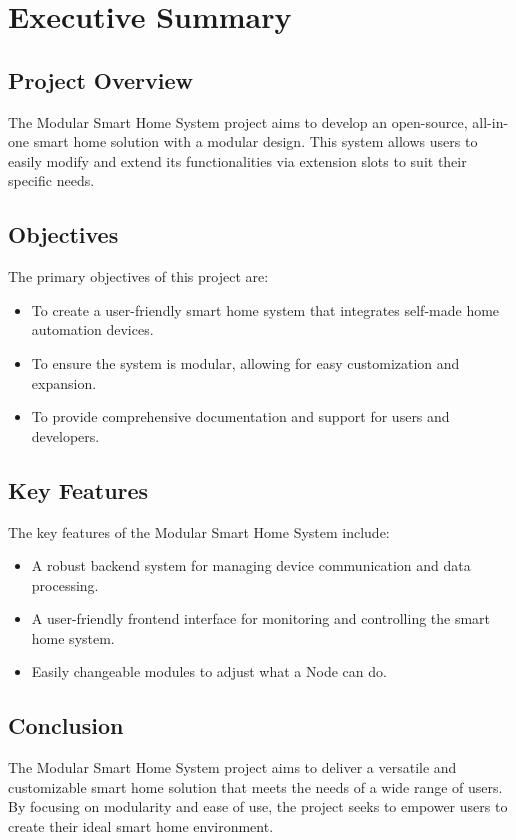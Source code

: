 \chapter{Executive Summary}

\section{Project Overview}
The Modular Smart Home System project aims to develop an open-source, 
all-in-one smart home solution with a modular design. This system 
allows users to easily modify and extend its functionalities via 
extension slots to suit their specific needs.

\section{Objectives}
The primary objectives of this project are:
\begin{itemize}
    \item To create a user-friendly smart home system that integrates self-made home automation devices.
    \item To ensure the system is modular, allowing for easy customization and expansion.
    \item To provide comprehensive documentation and support for users and developers.
\end{itemize}

\section{Key Features}
The key features of the Modular Smart Home System include:
\begin{itemize}
    \item A robust backend system for managing device communication and data processing.
    \item A user-friendly frontend interface for monitoring and controlling the smart home system.
    \item Easily changeable modules to adjust what a Node can do.
\end{itemize}

\section{Conclusion}
The Modular Smart Home System project aims to deliver a versatile 
and customizable smart home solution that meets the needs of a wide 
range of users. By focusing on modularity and ease of use, the project 
seeks to empower users to create their ideal smart home environment.